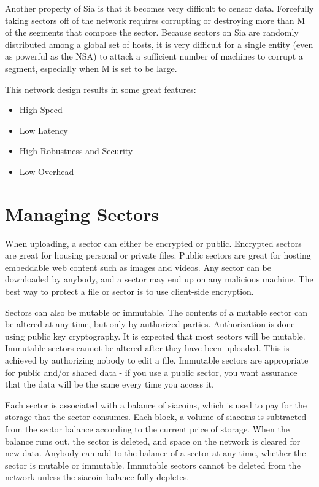 \documentclass[twocolumn]{article}
\begin{document}
Another property of Sia is that it becomes very difficult to censor data.
Forcefully taking sectors off of the network requires corrupting or destroying more than M of the \quorumsize{} segments that compose the sector.
Because sectors on Sia are randomly distributed among a global set of hosts, it is very difficult for a single entity (even as powerful as the NSA) to attack a sufficient number of machines to corrupt a segment, especially when M is set to be large.

This network design results in some great features:
\begin{itemize}
	\item High Speed
	\item Low Latency
	\item High Robustness and Security
	\item Low Overhead
\end{itemize}

\section{Managing Sectors}
When uploading, a sector can either be encrypted or public.
Encrypted sectors are great for housing personal or private files.
Public sectors are great for hosting embeddable web content such as images and videos.
Any sector can be downloaded by anybody, and a sector may end up on any malicious machine.
The best way to protect a file or sector is to use client-side encryption.

Sectors can also be mutable or immutable.
The contents of a mutable sector can be altered at any time, but only by authorized parties.
Authorization is done using public key cryptography.
It is expected that most sectors will be mutable.
Immutable sectors cannot be altered after they have been uploaded.
This is achieved by authorizing nobody to edit a file.
Immutable sectors are appropriate for public and/or shared data - if you use a public sector, you want assurance that the data will be the same every time you access it.

Each sector is associated with a balance of siacoins, which is used to pay for the storage that the sector consumes.
Each block, a volume of siacoins is subtracted from the sector balance according to the current price of storage.
When the balance runs out, the sector is deleted, and space on the network is cleared for new data.
Anybody can add to the balance of a sector at any time, whether the sector is mutable or immutable.
Immutable sectors cannot be deleted from the network unless the siacoin balance fully depletes.
\end{document}
